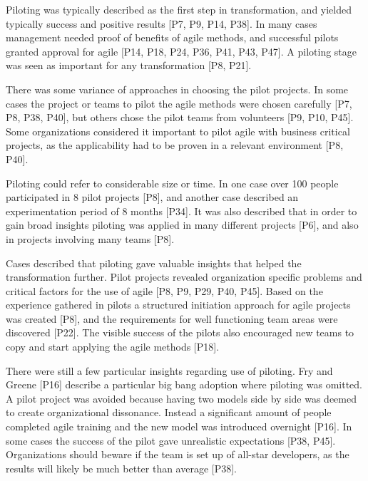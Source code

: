 Piloting was typically described as the first step in transformation, and
yielded typically success and positive results [P7, P9, P14, P38]. In many cases
management needed proof of benefits of agile methods, and successful pilots
granted approval for agile [P14, P18, P24, P36, P41, P43, P47].
A piloting stage was seen as important for any transformation [P8, P21].


There was some variance of approaches in choosing the pilot projects.
In some cases the project or teams to pilot the agile methods were chosen
carefully [P7, P8, P38, P40], but others chose the pilot teams from volunteers
[P9, P10, P45].
Some organizations considered it important to pilot agile with business critical
projects, as the applicability had to be proven in a relevant environment [P8,
P40].

Piloting could refer to considerable size or time. In one case over 100 people
participated in 8 pilot projects [P8], and another case described an
experimentation period of 8 months [P34].
It was also described that in order to gain broad insights piloting was applied
in many different projects [P6], and also in projects involving many teams [P8].

Cases described that piloting gave valuable insights that helped the
transformation further.
Pilot projects revealed organization specific problems and critical factors for
the use of agile [P8, P9, P29, P40, P45].
Based on the experience gathered in pilots a structured initiation approach for
agile projects was created [P8], and the requirements for well functioning team
areas were discovered [P22].
The visible success of the pilots also encouraged new teams to copy and start
applying the agile methods [P18].


There were still a few particular insights regarding use of piloting.
Fry and Greene [P16] describe a particular big bang adoption where piloting was
omitted. A pilot project was avoided because having two models side by side was
deemed to create organizational dissonance. Instead a significant amount of
people completed agile training and the new model was introduced overnight
[P16].
In some cases the success of the pilot gave unrealistic expectations [P38, P45].
Organizations should beware if the team is set up of all-star developers, as
the results will likely be much better than average [P38].

